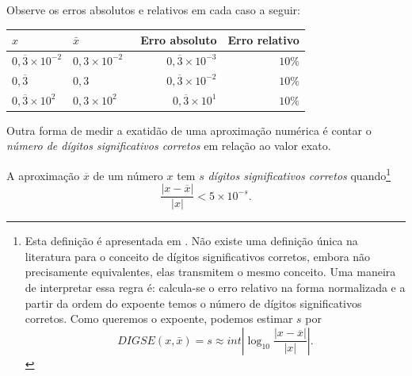 \begin{ex}
Observe os erros absolutos e relativos em cada caso a seguir:
\begin{center}
  \begin{tabular}{ll|rr} \hline
    $x$ & $\bar{x}$ &\ Erro absoluto & Erro relativo\\\hline
    $0,\overline{3}\times 10^{-2}$ & $0,3\times 10^{-2}$ & $0,\overline{3}\times 10^{-3}$ & $10\%$\\
    $0,\overline{3}$              & $0,3$ & $0,\overline{3}\times 10^{-2}$ & $10\%$\\
    $0,\overline{3}\times 10^{2}$ & $0,3\times 10^{2}$ & $0,\overline{3}\times 10^{1}$ & $10\%$\\\hline
\end{tabular}
\end{center}
\end{ex}

Outra forma de medir a exatidão de uma aproximação numérica é contar o \emph{número de dígitos significativos corretos} em relação ao valor exato.

\begin{defn}\label{def:num_dig_sig_corretos}
A aproximação $\overline{x}$ de um número $x$ tem $s$ \emph{dígitos significativos corretos} quando\footnote{Esta definição é apresentada em \cite{Burden2013}. Não existe uma definição única na literatura para o conceito de dígitos significativos corretos, embora não precisamente equivalentes, elas transmitem o mesmo conceito.
Uma maneira de interpretar essa regra é: calcula-se o erro relativo na forma normalizada e a partir da ordem do expoente temos o número de dígitos significativos corretos. Como queremos o expoente, podemos estimar $s$ por
\begin{equation}  DIGSE(x,\bar{x})=s \approx int \left|\log_{10} \frac{|x-\overline{x}|}{|x|}\right|.  \end{equation}
}
\begin{equation}
\frac{|x-\overline{x}|}{|x|} < 5\times 10^{-s}.
\end{equation}
\end{defn}


